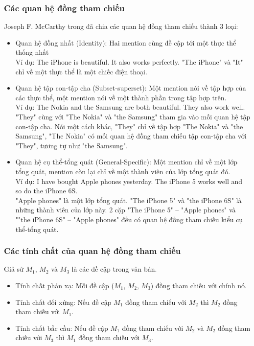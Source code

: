 \documentclass[12pt]{extarticle}
\begin{document}
			\subsubsection*{Các quan hệ đồng tham chiếu}		
				Joseph F. McCarthy trong \cite{corefdef} đã chia các quan hệ đồng tham chiếu thành 3 loại: 
				\begin{itemize}
					\item{Quan hệ đồng nhất (Identity): Hai mention cùng đề cập tới một thực thể thống nhất\\
					Ví dụ: The iPhone is beautiful. It also works perfectly.
					"The iPhone" và "It" chỉ về một thực thể là một chiếc điện thoại.}
					\item{Quan hệ tập con-tập cha (Subset-superset): Một mention nói về tập hợp của các thực thể, một mention nói về một thành phần trong tập hợp trên.\\
					Ví dụ: The Nokia and the Samsung are both beautiful. They also work well.\\
					"They" cùng với "The Nokia" và "the Samsung" tham gia vào mối quan hệ tập con-tập cha. Nói một cách khác, "They" chỉ về tập hợp "The Nokia" và "the Samsung", "The Nokia" có mối quan hệ đồng tham chiếu tập con-tập cha với "They", tương tự như "the Samsung".}
					\item{Quan hệ cụ thể-tổng quát (General-Specific): Một mention chỉ về một lớp tổng quát, mention còn lại chỉ về một thành viên của lớp tổng quát đó.\\
					Ví dụ: I have bought Apple phones yesterday. The iPhone 5 works well and so do the iPhone 6S.\\
					"Apple phones" là một lớp tổng quát. "The iPhone 5" và "the iPhone 6S" là những thành viên của lớp này. 2 cặp "The iPhone 5" – "Apple phones" và ""the iPhone 6S" – "Apple phones" đều có quan hệ đồng tham chiếu kiểu cụ thể-tổng quát.}
				\end{itemize}
			\subsubsection*{Các tính chất của quan hệ đồng tham chiếu}
			Giả sử $M_1$, $M_2$ và $M_3$ là các đề cập trong văn bản.
			\begin{itemize}
				\item{Tính chất phản xạ: Mỗi đề cập ($M_1$, $M_2$, $M_3$) đồng tham chiếu với chính nó.}
				\item{Tính chất đối xứng: Nếu đề cập $M_1$ đồng tham chiếu với $M_2$ thì $M_2$ đồng tham chiếu với $M_1$.}
				\item{Tính chất bắc cầu: Nếu đề cập $M_1$ đồng tham chiếu với $M_2$ và $M_2$ đồng tham chiếu với $M_3$ thì $M_1$ đồng tham chiếu với $M_3$.}
			\end{itemize}
\end{document}
